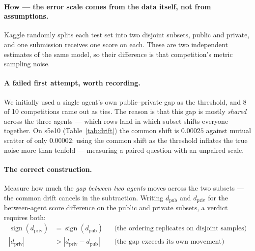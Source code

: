\documentclass[11pt,a4paper]{article}
\begin{document}
\paragraph{How --- the error scale comes from the data itself, not from assumptions.} Kaggle randomly splits each test set into two disjoint subsets, public and private, and one submission receives one score on each. These are two independent estimates of the same model, so their difference is that competition's metric sampling noise.

\paragraph{A failed first attempt, worth recording.} We initially used a single agent's own public--private gap as the threshold, and 8 of 10 competitions came out as ties. The reason is that this gap is mostly \emph{shared} across the three agents --- which rows land in which subset shifts everyone together. On s5e10 (Table~\ref{tab:drift}) the common shift is $0.00025$ against mutual scatter of only $0.00002$: using the common shift as the threshold inflates the true noise more than tenfold --- measuring a paired question with an unpaired scale.

\paragraph{The correct construction.} Measure how much the \emph{gap between two agents} moves across the two subsets --- the common drift cancels in the subtraction. Writing $d_{\mathrm{pub}}$ and $d_{\mathrm{priv}}$ for the between-agent score difference on the public and private subsets, a verdict requires both:
\begin{align}
\operatorname{sign}(d_{\mathrm{priv}}) &= \operatorname{sign}(d_{\mathrm{pub}})
  && \text{(the ordering replicates on disjoint samples)} \\
|d_{\mathrm{priv}}| &> |d_{\mathrm{priv}} - d_{\mathrm{pub}}|
  && \text{(the gap exceeds its own movement)}
\end{align}
\end{document}
